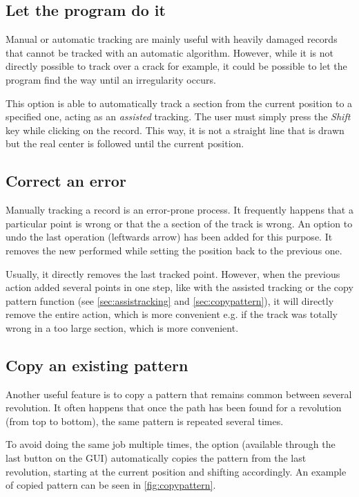 \subsection{Let the program do it}
\label{sec:assistracking}

Manual or automatic tracking are mainly useful with heavily damaged records that cannot be tracked with an automatic algorithm. However, while it is not directly possible to track over a crack for example, it could be possible to let the program find the way until an irregularity occurs.

This option is able to automatically track a section from the current position to a specified one, acting as an \emph{assisted} tracking. The user must simply press the \emph{Shift} key while clicking on the record. This way, it is not a straight line that is drawn but the real center is followed until the current position.

\subsection{Correct an error}

Manually tracking a record is an error-prone process. It frequently happens that a particular point is wrong or that the a section of the track is wrong. An option to undo the last operation (leftwards arrow) has been added for this purpose. It removes the new performed while setting the position back to the previous one.

Usually, it directly removes the last tracked point. However, when the previous action added several points in one step, like with the assisted tracking or the copy pattern function (see \autoref{sec:assistracking} and \autoref{sec:copypattern}), it will directly remove the entire action, which is more convenient e.g. if the track was totally wrong in a too large section, which is more convenient.

\subsection{Copy an existing pattern}
\label{sec:copypattern}

Another useful feature is to copy a pattern that remains common between several revolution. It often happens that once the path has been found for a revolution (from top to bottom), the same pattern is repeated several times.

To avoid doing the same job multiple times, the option (available through the last button on the GUI) automatically copies the pattern from the last revolution, starting at the current position and shifting accordingly. An example of copied pattern can be seen in \autoref{fig:copypattern}.

